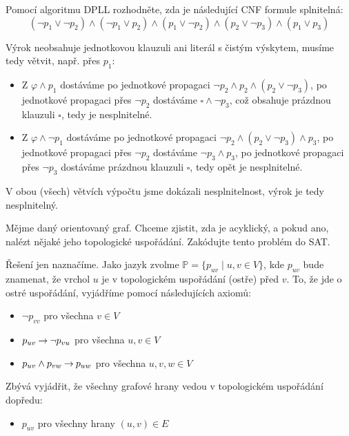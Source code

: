 \begin{problem} \label{problem:dpll}

    Pomocí algoritmu DPLL rozhodněte, zda je následující CNF formule splnitelná:
    $$ 
    (\neg p_1 \lor \neg p_2)\land( \neg p_1 \lor p_2)\land( p_1 \lor \neg p_2)\land( p_2 \lor \neg p_3)\land( p_1 \lor p_3)
    $$

    \begin{solution}
        Výrok neobsahuje jednotkovou klauzuli ani literál s čistým výskytem, musíme tedy větvit, např. přes $p_1$:
        \begin{itemize}
            \item Z $\varphi\land p_1$ dostáváme po jednotkové propagaci
            $\neg p_2\land p_2\land( p_2 \lor \neg p_3)$, po jednotkové propagaci přes $\neg p_2$ dostáváme $\square\land\neg p_3$, což obsahuje prázdnou klauzuli $\square$, tedy je nesplnitelné.
            \item Z $\varphi\land \neg p_1$ dostáváme po jednotkové propagaci
            $\neg p_2\land( p_2 \lor \neg p_3)\land p_3$, po jednotkové propagaci přes $\neg p_2$ dostáváme $\neg p_3\land p_3$, po jednotkové propagaci přes $\neg p_3$ dostáváme prázdnou klauzuli $\square$, tedy opět je nesplnitelné.            
        \end{itemize}
        V obou (všech) větvích výpočtu jsme dokázali nesplnitelnost, výrok je tedy nesplnitelný.                        
    \end{solution}

\end{problem}


\begin{problem}

    Mějme daný orientovaný graf. Chceme zjistit, zda je acyklický, a pokud ano, nalézt nějaké jeho topologické uspořádání. Zakódujte tento problém do SAT.

    \begin{solution}
        Řešení jen naznačíme. Jako jazyk zvolme $\mathbb P=\{p_{uv}\mid u,v\in V\}$, kde $p_{uv}$ bude znamenat, že vrchol $u$ je v topologickém uspořádání (ostře) před $v$. To, že jde o ostré uspořádání, vyjádříme pomocí následujících axiomů:
        \begin{itemize}
            \item $\neg p_{vv}$ pro všechna $v\in V$
            \item $p_{uv}\mathbin{\rightarrow}\neg p_{vu}$ pro všechna $u,v\in V$
            \item $p_{uv}\land p_{vw}\mathbin{\rightarrow} p_{uw}$ pro všechna $u,v,w\in V$
        \end{itemize}
        Zbývá vyjádřit, že všechny grafové hrany vedou v topologickém uspořádání dopředu:
        \begin{itemize}
            \item $p_{uv}$ pro všechny hrany $(u,v)\in E$
        \end{itemize}



    \end{solution}

\end{problem}
    
